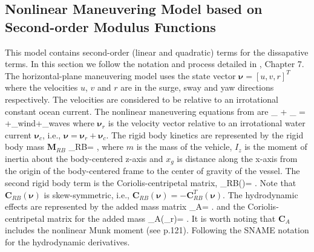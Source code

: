 \documentclass[11pt,draftcls,journal,onecolumn]{../latexlib/latex_ieee/IEEEtran}
\begin{document}
\subsection{Nonlinear Maneuvering Model based on Second-order Modulus Functions}
This model contains second-order (linear and quadratic) terms for the dissapative terms. In this section we follow the notation and process detailed in \cite{fossen11handbook}, Chapter 7. The horizontal-plane maneuvering model uses the state vector $\bm{\nu}=[u,v,r]^T$ where the velocities $u$, $v$ and $r$ are in the surge, sway and yaw directions respectively.  The velocities are considered to be relative to an irrotational constant ocean current.  The nonlinear maneuvering equations from \cite{fossen11handbook} are
\beqn
{}_ +
_
= \bm{\tau}+\bm{\tau}_{wind}+\bm{\tau}_{waves}
\label{e:fossenmodel}
\eeqn
where $\bm{\nu}_r$ is the velocity vector relative to an irrotational water current $\bm{\nu}_c$, i.e., $\bm{\nu}=\bm{\nu}_r+\bm{\nu}_c$.  The rigid body kinetics are represented by the rigid body mass $\bm{M}_{RB}$ 
\beqn
{}_{RB}= ,
\eeqn
where $m$ is the mass of the vehicle, $I_z$ is the moment of inertia about the body-centered z-axis and $x_g$ is distance along the x-axis from the origin of the body-centered frame to the center of gravity of the vessel.  The second rigid body term is the Coriolis-centripetal matrix,
\beqn
{}_{RB}(\bm{\nu})= .
\eeqn
Note that $\bm{C}_{RB}(\bm{\nu})$ is skew-symmetric, i.e., $\bm{C}_{RB}(\bm{\nu})=-\bm{C}_{RB}^T(\bm{\nu})$.  The hydrodynamic effects are represented by the added mass matrix
\beqn
{}_{A}= .
\eeqn
and the Coriolis-centripetal matrix for the added mass
\beqn
{}_{A}(\bm{\nu}_r)= .
\eeqn
It is worth noting that $\bm{C}_A$ includes the nonlinear Munk moment (see \cite{fossen11handbook} p.121).  Following \cite{fossen11handbook} the SNAME notation for the hydrodynamic derivatives.
\end{document}

